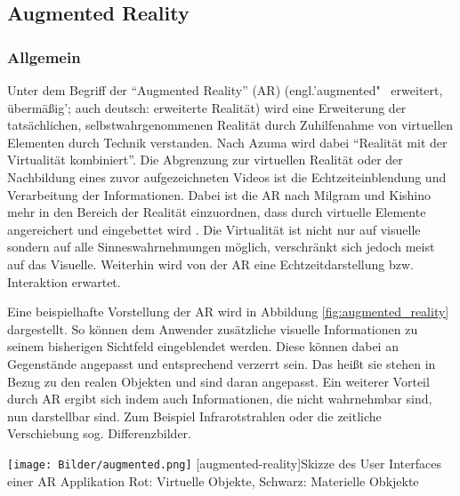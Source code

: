 \documentclass[12pt,a4paper,bibliography=totocnumbered,listof=totocnumbered]{scrartcl}
\begin{document}
\subsection{Augmented Reality}
\subsubsection{Allgemein}
Unter dem Begriff der “Augmented Reality” (\ac{AR}) (engl.'augmented"~ erweitert, übermäßig'; auch deutsch: erweiterte Realität) wird eine Erweiterung der tatsächlichen, selbstwahrgenommenen Realität durch Zuhilfenahme von virtuellen Elementen durch Technik verstanden. Nach Azuma wird dabei “Realität mit der Virtualität kombiniert”. Die Abgrenzung zur virtuellen Realität oder der Nachbildung eines zuvor aufgezeichneten Videos ist die Echtzeiteinblendung und Verarbeitung der Informationen. Dabei ist die AR nach Milgram und Kishino mehr in den Bereich der Realität einzuordnen, dass durch virtuelle Elemente angereichert und eingebettet wird \cite{Tonnis:2010aa}. Die Virtualität ist nicht nur auf visuelle sondern auf alle Sinneswahrnehmungen möglich, verschränkt sich jedoch meist auf das Visuelle. Weiterhin wird von der AR eine Echtzeitdarstellung bzw. Interaktion erwartet. 

	Eine beispielhafte Vorstellung der AR wird in Abbildung \ref{fig:augmented_reality} dargestellt. So können dem Anwender zusätzliche visuelle Informationen zu seinem bisherigen Sichtfeld eingeblendet werden. Diese können dabei an Gegenstände angepasst und entsprechend verzerrt sein. Das heißt sie stehen in Bezug zu den realen Objekten und sind daran angepasst. 
	Ein weiterer Vorteil durch AR ergibt sich indem auch Informationen, die nicht wahrnehmbar sind, nun darstellbar sind. Zum Beispiel Infrarotstrahlen oder die zeitliche Verschiebung sog. Differenzbilder.
	

\begin{minipage}{\linewidth}
\vspace{1em}
	\centering
	\texttt{[image: Bilder/augmented.png]}
	[augmented-reality]{Skizze des User Interfaces einer AR Applikation\newline
	Rot: Virtuelle Objekte, Schwarz: Materielle Obkjekte}
	\label{fig:augmented_reality}
\vspace{1em}
\end{minipage}
\end{document}

